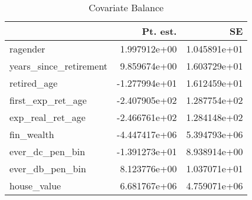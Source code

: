 \begin{table}

\caption{\label{tab:another_lab}Covariate Balance \label{tab:cov_balance}}
\centering
\begin{tabular}[t]{lrr}
\toprule
 & Pt. est. & SE\\
\midrule
ragender & 1.997912e+00 & 1.045891e+01\\
years\_since\_retirement & 9.859674e+00 & 1.603729e+01\\
retired\_age & -1.277994e+01 & 1.612459e+01\\
first\_exp\_ret\_age & -2.407905e+02 & 1.287754e+02\\
exp\_real\_ret\_age & -2.466761e+02 & 1.284148e+02\\
\addlinespace
fin\_wealth & -4.447417e+06 & 5.394793e+06\\
ever\_dc\_pen\_bin & -1.391273e+01 & 8.938914e+00\\
ever\_db\_pen\_bin & 8.123776e+00 & 1.037071e+01\\
house\_value & 6.681767e+06 & 4.759071e+06\\
\bottomrule
\end{tabular}
\end{table}
